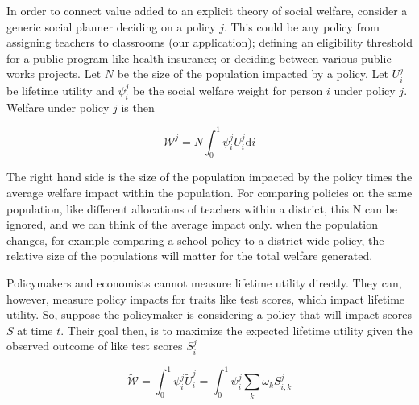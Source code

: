 \documentclass[12pt]{article}
\theoremstyle{definition}
\theoremstyle{definition}
\theoremstyle{definition}
\theoremstyle{definition}
\begin{document}
    
    
    
    In order to connect value added to an explicit theory of social welfare, consider a generic social planner deciding on a policy $j$. This could be any policy from assigning teachers to classrooms (our application);  defining an eligibility threshold for a public program like health insurance; or deciding between various public works projects. Let $N$ be the size of the population impacted by a policy. Let $U^j_i$ be lifetime utility and $\psi^j_i$ be the social welfare weight for person $i$ under policy $j$. Welfare under policy $j$ is then
        
        \begin{equation}
        \mathcal{W}^j = N \int_0^1 \psi^j_i U^j_i \text{d}i
        \end{equation}
    
    The right hand side is the size of the population impacted by the policy times the average welfare impact within the population. For comparing policies on the same population, like different allocations of teachers within a district, this N can be ignored, and we can think of the average impact only. when the population changes, for example comparing a school policy to a district wide policy, the relative size of the populations will matter for the total welfare generated. 




  Policymakers and economists cannot measure lifetime utility directly. They can, however, measure policy impacts for traits like test scores, which impact lifetime utility. So, suppose the policymaker is considering a policy that will impact scores $S$ at time $t$. Their goal then, is to maximize the expected lifetime utility given the observed outcome of like test scores $S_i^j$

\[
\tilde{\mathcal{W}} = \int_0^1 \psi^j_i \tilde{U}^j_i = \int_0^1 \psi^j_i \sum_k \omega_k  S^j_{i,k}
\]
\end{document}
